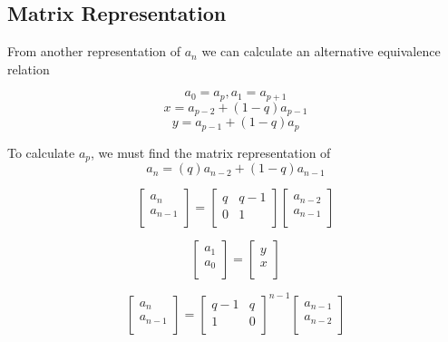 \documentclass[paper.tex]{subfiles}
\begin{document}
\subsection{Matrix Representation}

From another representation of $a_{n}$ we can calculate an alternative equivalence relation

$$a_{0} = a_{p}, a_{1} = a_{p+1}$$
$$x = a_{p-2} + (1-q)a_{p-1}$$
$$ y = a_{p-1} + (1-q)a_{p}$$

To calculate $a_{p}$, we must find the matrix representation of
$$ a_{n} = (q)a_{n-2} + (1-q)a_{n-1} $$



\[
\left[ \begin{array}{ccc}
a_{n} \\
a_{n-1} \\
\end{array} \right]
=
\left[ \begin{array}{ccc}
q & q-1 \\
0 & 1 \\
\end{array} \right]
\left[ \begin{array}{ccc}
 a_{n-2}\\
a_{n-1} \\
\end{array} \right]
\]

\[
\left[ \begin{array}{ccc}
a_{1} \\
a_{0} \\
\end{array} \right]
=
\left[ \begin{array}{ccc}
y \\
x \\
\end{array} \right]
\]

\[
\left[ \begin{array}{ccc}
a_{n} \\
a_{n-1} \\
\end{array} \right]
=
\left[ \begin{array}{ccc}
q-1 & q \\
1 & 0 \\
\end{array} \right] ^{n-1}
\left[ \begin{array}{ccc}
 a_{n-1}\\
a_{n-2} \\
\end{array} \right]
\]
\end{document}
